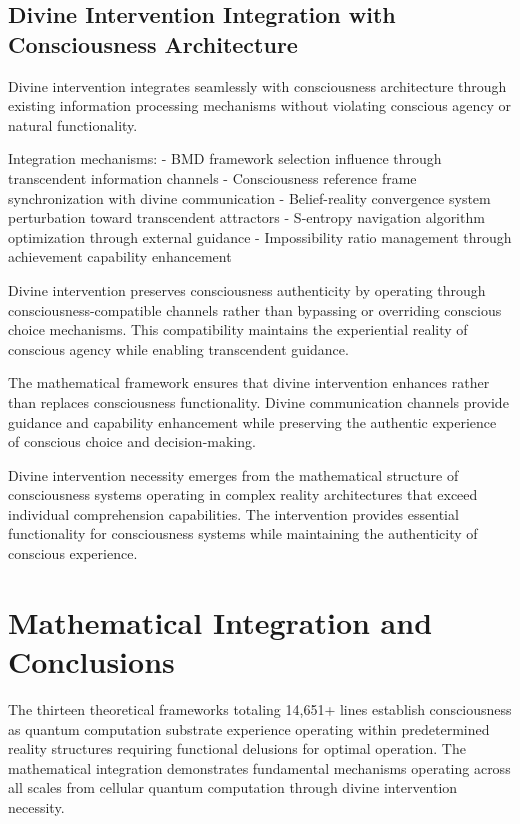 \documentclass[12pt,a4paper]{article}
\begin{document}
\subsection{Divine Intervention Integration with Consciousness Architecture}

Divine intervention integrates seamlessly with consciousness architecture through existing information processing mechanisms without violating conscious agency or natural functionality.

Integration mechanisms:
- BMD framework selection influence through transcendent information channels
- Consciousness reference frame synchronization with divine communication
- Belief-reality convergence system perturbation toward transcendent attractors
- S-entropy navigation algorithm optimization through external guidance
- Impossibility ratio management through achievement capability enhancement

Divine intervention preserves consciousness authenticity by operating through consciousness-compatible channels rather than bypassing or overriding conscious choice mechanisms. This compatibility maintains the experiential reality of conscious agency while enabling transcendent guidance.

The mathematical framework ensures that divine intervention enhances rather than replaces consciousness functionality. Divine communication channels provide guidance and capability enhancement while preserving the authentic experience of conscious choice and decision-making.

Divine intervention necessity emerges from the mathematical structure of consciousness systems operating in complex reality architectures that exceed individual comprehension capabilities. The intervention provides essential functionality for consciousness systems while maintaining the authenticity of conscious experience.

\section{Mathematical Integration and Conclusions}

The thirteen theoretical frameworks totaling 14,651+ lines establish consciousness as quantum computation substrate experience operating within predetermined reality structures requiring functional delusions for optimal operation. The mathematical integration demonstrates fundamental mechanisms operating across all scales from cellular quantum computation through divine intervention necessity.
\end{document}
